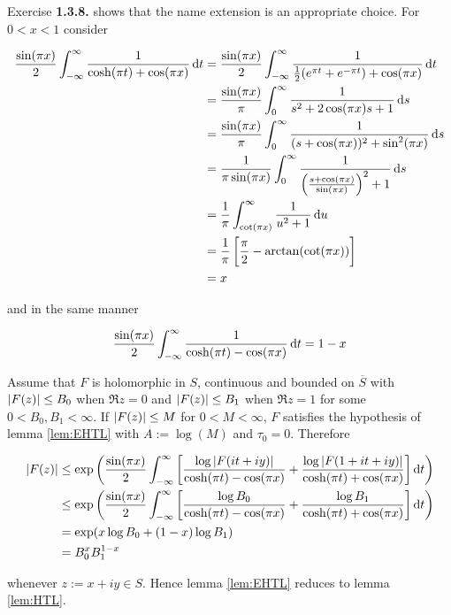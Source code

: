 \begin{remark}
	Exercise \textbf{1.3.8.} \textup{\cite[48]{grafakos:fourier:2014}} shows that the name extension is an appropriate choice. For $0 < x < 1$ consider

	\begin{equation*}
		\begin{aligned}
			\frac{\sin( \pi x )}{2} \int_{-\infty}^\infty \frac{1}{\cosh(\pi t ) + \cos( \pi x )} \d t &= \frac{\sin( \pi x )}{2} \int_{-\infty}^\infty \frac{1}{\frac{1}{2}( e^{\pi t} + e^{-\pi t} ) + \cos( \pi x )} \d t\\
			&= \frac{\sin( \pi x )}{\pi} \int_{0}^\infty \frac{1}{s^2 + 2\cos( \pi x )s + 1} \d s\\
			&= \frac{\sin( \pi x )}{\pi} \int_{0}^\infty \frac{1}{( s + \cos( \pi x ) )^2 + \sin^2( \pi x )} \d s\\
			&= \frac{1}{\pi\sin( \pi x )} \int_{0}^\infty \frac{1}{\del{ \frac{s + \cos( \pi x )}{\sin( \pi x )}}^2 + 1} \d s\\
			&= \frac{1}{\pi} \int_{\cot( \pi x )}^\infty \frac{1}{u^2 + 1} \d u\\
			&= \frac{1}{\pi}\sbr{ \frac{\pi}{2} - \arctan( \cot( \pi x )) }\\
			&= x
		\end{aligned}
	\end{equation*}

	\noindent and in the same manner

	\begin{equation*}
		\frac{\sin( \pi x )}{2} \int_{-\infty}^\infty \frac{1}{\cosh( \pi t ) - \cos( \pi x )} \mathop{}\!\mathrm{d} t = 1 - x	
	\end{equation*}

	Assume that $F$ is holomorphic in $S$, continuous and bounded on $\overline{S}$ with $\abs[0]{F( z )} \leq B_0$ when $\Re z = 0$ and $\abs[0]{F( z )} \leq B_1$ when $\Re z = 1$ for some $0 < B_0, B_1 < \infty$. If $\abs[0]{F( z )} \leq M$ for $0 < M < \infty$, $F$ satisfies the hypothesis of lemma \ref{lem:EHTL} with $A := \log( M )$ and $\tau_0 = 0$. Therefore 
	
	\begin{equation*}
		\begin{aligned}
			\abs[0]{ F(z) } &\leq \exp\del[3]{ \frac{\sin(\pi x)}{2} \int_{-\infty}^\infty \sbr{ \frac{\log \abs[0]{ F(it + iy)}}{\cosh(\pi t) - \cos(\pi x)} + \frac{\log \abs[0]{ F(1 + it + iy)}}{\cosh(\pi t) + \cos(\pi x)} } \d t}\\
			&\leq \exp\del[3]{ \frac{\sin(\pi x)}{2} \int_{-\infty}^\infty \sbr{ \frac{\log B_0}{\cosh(\pi t) - \cos(\pi x)} + \frac{\log B_1}{\cosh(\pi t) + \cos(\pi x)} } \d t}\\
		&= \exp( x\log B_0 + ( 1 - x)\log B_1 )\\
		&= B_0^xB_1^{1 - x}
		\end{aligned}
	\end{equation*}

	\noindent whenever $z := x + iy \in S$. Hence lemma \ref{lem:EHTL} reduces to lemma \ref{lem:HTL}.
\end{remark}

